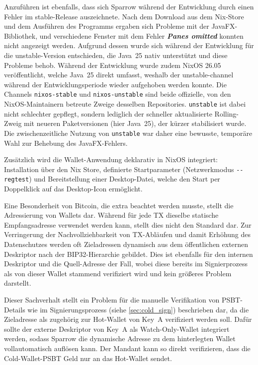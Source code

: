 Anzuführen ist ebenfalls, dass sich Sparrow während der Entwicklung durch einen Fehler im stable-Release auszeichnete. Nach dem Download aus dem Nix-Store und dem Ausführen des Programms ergaben sich Probleme mit der JavaFX-Bibliothek, und verschiedene Fenster mit dem Fehler \emph{\textbf{Panes omitted}} konnten nicht angezeigt werden.
Aufgrund dessen wurde sich während der Entwicklung für die unstable-Version entschieden, die Java~25 nativ unterstützt und diese Probleme behob. Während der Entwicklung wurde zudem NixOS 26.05 veröffentlicht, welche Java~25 direkt umfasst, weshalb der unstable-channel während der Entwicklungsperiode wieder aufgehoben werden konnte.
Die Channels \texttt{nixos-stable} und \texttt{nixos-unstable} sind beide offizielle, von den NixOS-Maintainern betreute Zweige desselben Repositories. \texttt{unstable} ist dabei nicht schlechter gepflegt, sondern lediglich der schneller aktualisierte Rolling-Zweig mit neueren Paketversionen (hier Java~25), der kürzer stabilisiert wurde. Die zwischenzeitliche Nutzung von \texttt{unstable} war daher eine bewusste, temporäre Wahl zur Behebung des JavaFX-Fehlers.

Zusätzlich wird die Wallet-Anwendung deklarativ in NixOS integriert: Installation über den Nix Store, definierte Startparameter (Netzwerkmodus \texttt{-{}-regtest}) und Bereitstellung einer Desktop-Datei, welche den Start per Doppelklick auf das Desktop-Icon ermöglicht.

\label{sec:dyn_adress}
Eine Besonderheit von Bitcoin, die extra beachtet werden musste, stellt die Adressierung von Wallets dar.
Während für jede \ac{TX} dieselbe statische Empfangsadresse verwendet werden kann, stellt dies nicht den Standard dar.
Zur Verringerung der Nachvollziehbarkeit von \ac{TX}-Abläufen und damit Erhöhung des Datenschutzes werden oft Zieladressen dynamisch aus dem öffentlichen externen Deskriptor nach der \ac{BIP}32-Hierarchie gebildet.
Dies ist ebenfalls für den internen Deskriptor und die Quell-Adresse der Fall, wobei diese bereits im Signierprozess als von dieser Wallet stammend verifiziert wird und kein größeres Problem darstellt.

Dieser Sachverhalt stellt ein Problem für die manuelle Verifikation von \ac{PSBT}-Details wie im Signierungsprozess (siehe \ref{sec:cold_sign}) beschrieben dar, da die Zieladresse als zugehörig zur Hot-Wallet von Key~A verifiziert werden soll.
Dafür sollte der externe Deskriptor von Key~A als Watch-Only-Wallet integriert werden, sodass Sparrow die dynamische Adresse zu dem hinterlegten Wallet vollautomatisch auflösen kann. Der Mandant kann so direkt verifizieren, dass die Cold-Wallet-\ac{PSBT} Geld nur an das Hot-Wallet sendet. 

